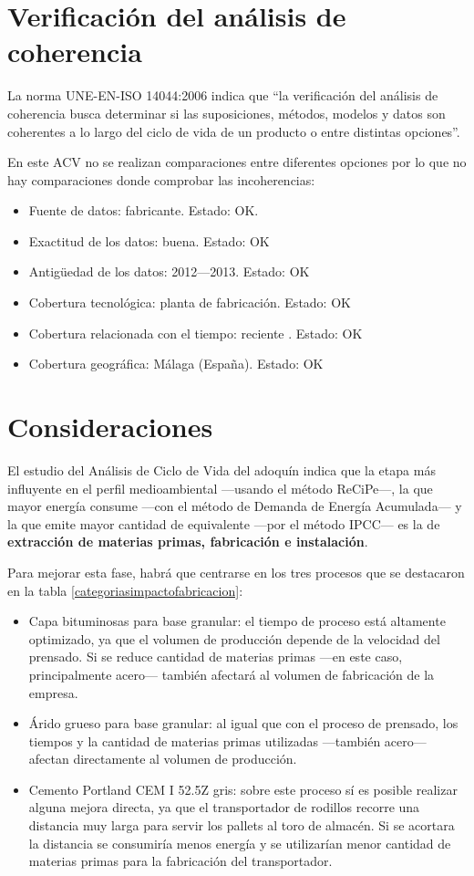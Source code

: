 \section{Verificación del análisis de coherencia}

La norma UNE-EN-ISO 14044:2006 indica que ``la verificación del análisis de coherencia busca determinar si las suposiciones, métodos, modelos y datos son coherentes a lo largo del ciclo de vida de un producto o entre distintas opciones''.

En este ACV no se realizan comparaciones entre diferentes opciones por lo que no hay comparaciones donde comprobar las incoherencias:

\begin{itemize}
  \item Fuente de datos: fabricante. Estado: OK.
  \item Exactitud de los datos: buena. Estado: OK
  \item Antigüedad de los datos: 2012—2013. Estado: OK
  \item Cobertura tecnológica: planta de fabricación. Estado: OK
  \item Cobertura relacionada con el tiempo: reciente . Estado: OK
  \item Cobertura geográfica: Málaga (España). Estado: OK
\end{itemize}

\section{Consideraciones}

El estudio del Análisis de Ciclo de Vida del adoquín indica que la etapa más influyente en el perfil medioambiental —usando el método ReCiPe—, la que mayor energía consume —con el método de Demanda de Energía Acumulada— y la que emite mayor cantidad de  equivalente —por el método IPCC— es la de \textbf{extracción de materias primas, fabricación e instalación}.

Para mejorar esta fase, habrá que centrarse en los tres procesos que se destacaron en la tabla \ref{categoriasimpactofabricacion}:

\begin{itemize}
  \item Capa bituminosas para base granular: el tiempo de proceso está altamente optimizado, ya que el volumen de producción depende de la velocidad del prensado. Si se reduce cantidad de materias primas —en este caso, principalmente acero— también afectará al volumen de fabricación de la empresa.
  \item Árido grueso para base granular: al igual que con el proceso de prensado, los tiempos y la cantidad de materias primas utilizadas —también acero— afectan directamente al volumen de producción.
  \item Cemento Portland CEM I 52.5Z gris: sobre este proceso sí es posible realizar alguna mejora directa, ya que el transportador de rodillos recorre una distancia muy larga para servir los pallets al toro de almacén. Si se acortara la distancia se consumiría menos energía y se utilizarían menor cantidad de materias primas para la fabricación del transportador.
\end{itemize}

